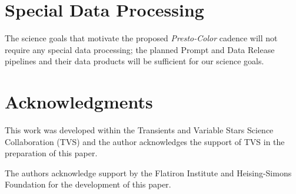\documentclass[12pt, letterpaper]{article}
\begin{document}
\vspace{.6in}

\clearpage
\section{Special Data Processing}

The science goals that motivate the proposed {\em Presto-Color} cadence will not require any special data processing; the planned Prompt and Data Release pipelines and their data products will be sufficient for our science goals. 

\section{Acknowledgments}
This work was developed within the Transients and Variable Stars Science Collaboration (TVS) and the author acknowledges the support of TVS in the preparation of this paper. 

\noindent
The authors acknowledge support by the Flatiron Institute and Heising-Simons Foundation for the development of this paper.


%


\end{document}
